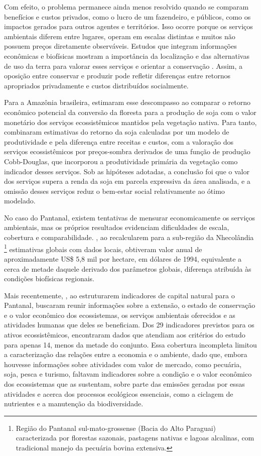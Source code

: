 Com efeito, o problema permanece ainda menos resolvido quando se comparam benefícios e custos privados, como o lucro de um fazendeiro, e públicos, como os impactos gerados para outros agentes e territórios. Isso ocorre porque os serviços ambientais diferem entre lugares, operam em escalas distintas e muitos não possuem preços diretamente observáveis. Estudos que integram informações econômicas e biofísicas mostram a importância da localização e das alternativas de uso da terra para valorar esses serviços e orientar a conservação \cite{Crossman2009,Gascoigne2011}. Assim, a oposição entre conservar e produzir pode refletir diferenças entre retornos apropriados privadamente e custos distribuídos socialmente.

Para a Amazônia brasileira,  estimaram esse descompasso ao comparar o retorno econômico potencial da conversão da floresta para a produção de soja com o valor monetário dos serviços ecossistêmicos mantidos pela vegetação nativa. Para tanto, combinaram estimativas do retorno da soja calculadas por um modelo de produtividade e pela diferença entre receitas e custos, com a valoração dos serviços ecossistêmicos por preços-sombra derivados de uma função de produção Cobb-Douglas, que incorporou a produtividade primária da vegetação como indicador desses serviços. Sob as hipóteses adotadas, a conclusão foi que o valor dos serviços supera a renda da soja em parcela expressiva da área analisada, e a omissão desses serviços reduz o bem-estar social relativamente ao ótimo modelado.

No caso do Pantanal, existem tentativas de mensurar economicamente os serviços ambientais, mas os próprios resultados evidenciam dificuldades de escala, cobertura e comparabilidade. , ao recalcularem para a sub-região da Nhecolândia \footnote{Região do Pantanal sul-mato-grossense (Bacia do Alto Paraguai) caracterizada por florestas sazonais, pastagens nativas e lagoas alcalinas, com tradicional manejo da pecuária bovina extensiva.} estimativas globais com dados locais, obtiveram valor anual de aproximadamente US\$ 5,8 mil por hectare, em dólares de 1994, equivalente a cerca de metade daquele derivado dos parâmetros globais, diferença atribuída às condições biofísicas regionais. 

Mais recentemente, , ao estruturarem indicadores de capital natural para o Pantanal, buscaram reunir informações sobre a extensão, o estado de conservação e o valor econômico dos ecossistemas, os serviços ambientais oferecidos e as atividades humanas que deles se beneficiam. Dos 29 indicadores previstos para os ativos ecossistêmicos, encontraram dados que atendiam aos critérios do estudo para apenas 14, menos da metade do conjunto. Essa cobertura incompleta limitou a caracterização das relações entre a economia e o ambiente, dado que, embora houvesse informações sobre atividades com valor de mercado, como pecuária, soja, pesca e turismo, faltavam indicadores sobre a condição e o valor econômico dos ecossistemas que as sustentam, sobre parte das emissões geradas por essas atividades e acerca dos processos ecológicos essenciais, como a ciclagem de nutrientes e a manutenção da biodiversidade.

